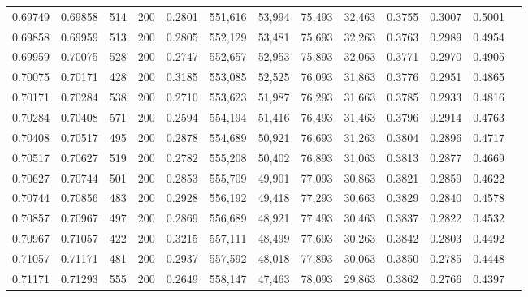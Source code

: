 \begin{tabular}{rrrrrrrrrrrrr}
0.69749 & 0.69858 &   514 & 200 &                                     0.2801 & 551,616 &  53,994 &  75,493 &  32,463 & 0.3755 & 0.3007 & 0.5001 \\
0.69858 & 0.69959 &   513 & 200 &                                     0.2805 & 552,129 &  53,481 &  75,693 &  32,263 & 0.3763 & 0.2989 & 0.4954 \\
0.69959 & 0.70075 &   528 & 200 &                                     0.2747 & 552,657 &  52,953 &  75,893 &  32,063 & 0.3771 & 0.2970 & 0.4905 \\
0.70075 & 0.70171 &   428 & 200 &                                     0.3185 & 553,085 &  52,525 &  76,093 &  31,863 & 0.3776 & 0.2951 & 0.4865 \\
0.70171 & 0.70284 &   538 & 200 &                                     0.2710 & 553,623 &  51,987 &  76,293 &  31,663 & 0.3785 & 0.2933 & 0.4816 \\
0.70284 & 0.70408 &   571 & 200 &                                     0.2594 & 554,194 &  51,416 &  76,493 &  31,463 & 0.3796 & 0.2914 & 0.4763 \\
0.70408 & 0.70517 &   495 & 200 &                                     0.2878 & 554,689 &  50,921 &  76,693 &  31,263 & 0.3804 & 0.2896 & 0.4717 \\
0.70517 & 0.70627 &   519 & 200 &                                     0.2782 & 555,208 &  50,402 &  76,893 &  31,063 & 0.3813 & 0.2877 & 0.4669 \\
0.70627 & 0.70744 &   501 & 200 &                                     0.2853 & 555,709 &  49,901 &  77,093 &  30,863 & 0.3821 & 0.2859 & 0.4622 \\
0.70744 & 0.70856 &   483 & 200 &                                     0.2928 & 556,192 &  49,418 &  77,293 &  30,663 & 0.3829 & 0.2840 & 0.4578 \\
0.70857 & 0.70967 &   497 & 200 &                                     0.2869 & 556,689 &  48,921 &  77,493 &  30,463 & 0.3837 & 0.2822 & 0.4532 \\
0.70967 & 0.71057 &   422 & 200 &                                     0.3215 & 557,111 &  48,499 &  77,693 &  30,263 & 0.3842 & 0.2803 & 0.4492 \\
0.71057 & 0.71171 &   481 & 200 &                                     0.2937 & 557,592 &  48,018 &  77,893 &  30,063 & 0.3850 & 0.2785 & 0.4448 \\
0.71171 & 0.71293 &   555 & 200 &                                     0.2649 & 558,147 &  47,463 &  78,093 &  29,863 & 0.3862 & 0.2766 & 0.4397 \\

\end{tabular}
